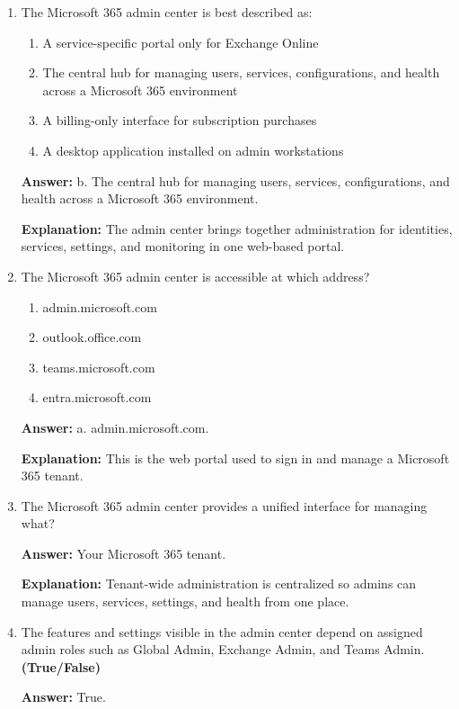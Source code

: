 \documentclass[10pt]{article}
\begin{document}
\begin{enumerate}[leftmargin=*]

\item The Microsoft 365 admin center is best described as:
\begin{enumerate}[label=\alph*., leftmargin=1.5em]
\item A service-specific portal only for Exchange Online
\item The central hub for managing users, services, configurations, and health across a Microsoft 365 environment
\item A billing-only interface for subscription purchases
\item A desktop application installed on admin workstations
\end{enumerate}
\textbf{Answer:} b. The central hub for managing users, services, configurations, and health across a Microsoft 365 environment.

\textbf{Explanation:} The admin center brings together administration for identities, services, settings, and monitoring in one web-based portal.

\item The Microsoft 365 admin center is accessible at which address?
\begin{enumerate}[label=\alph*., leftmargin=1.5em]
\item admin.microsoft.com
\item outlook.office.com
\item teams.microsoft.com
\item entra.microsoft.com
\end{enumerate}
\textbf{Answer:} a. admin.microsoft.com.

\textbf{Explanation:} This is the web portal used to sign in and manage a Microsoft 365 tenant.

\item The Microsoft 365 admin center provides a unified interface for managing what?

\textbf{Answer:} Your Microsoft 365 tenant.

\textbf{Explanation:} Tenant-wide administration is centralized so admins can manage users, services, settings, and health from one place.

\item The features and settings visible in the admin center depend on assigned admin roles such as Global Admin, Exchange Admin, and Teams Admin. \textbf{(True/False)}

\textbf{Answer:} True.


\end{enumerate}
\end{document}
